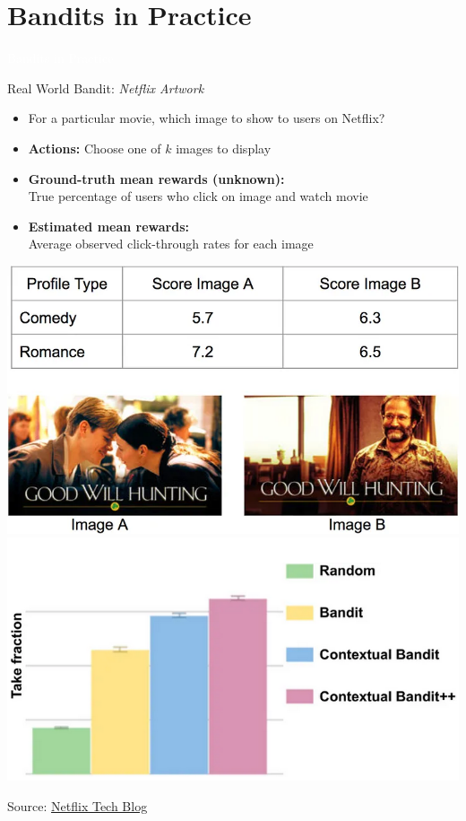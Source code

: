 \documentclass[11pt,table]{beamer}
\begin{document}
\section{Bandits in Practice}
{
\begin{frame}
\centering
\Huge
\textcolor{white}{Bandits in Practice}
\thispagestyle{empty}
\end{frame}
}

\begin{frame}{Real World Bandit: \textit{Netflix Artwork}}
\small
    \begin{itemize}
        \item For a particular movie, which image to show to users on Netflix?
        \item \textbf{Actions:} Choose one of \( k \) images to display
        \item \textbf{Ground-truth mean rewards (unknown):}\\ True percentage of users who click on image and watch movie
        \item \textbf{Estimated mean rewards:}\\ Average observed click-through rates for each image
    \end{itemize}
    \vspace{1em}
    \begin{center}
        \includegraphics[width=0.45\linewidth]{figures/good will hunting contextual}
        \includegraphics[width=0.45\linewidth]{figures/take fraction}
				
    \end{center}
    \vspace{0.5em}
    \small{Source: \href{https://medium.com/netflix-techblog/artwork-personalization-c589f074ad76}{Netflix Tech Blog}}
\end{frame}
\end{document}
